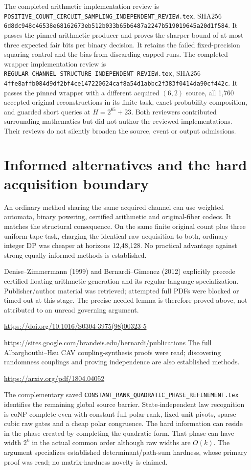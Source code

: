 \documentclass[11pt]{article}
\begin{document}
The completed arithmetic implementation review is
\nolinkurl{POSITIVE_COUNT_CIRCUIT_SAMPLING_INDEPENDENT_REVIEW.tex}, SHA256
\nolinkurl{6d8dc948c46538e68162673eb512b033b65b6487a2247b519019645a20d1f584}.
It passes the pinned arithmetic producer and proves the sharper bound of
at most three expected fair bits per binary decision. It retains the failed
fixed-precision squaring control and the bias from discarding capped runs.
The completed wrapper implementation review is
\nolinkurl{REGULAR_CHANNEL_STRUCTURE_INDEPENDENT_REVIEW.tex}, SHA256
\nolinkurl{4ffe8affb084d9df2bf4ce147220624caf8a54d1abbc2f383f0414da90cf442c}.
It passes the pinned wrapper with a different acquired $(6,2)$ source,
all 1,760 accepted original reconstructions in its finite task, exact
probability composition, and guarded short queries at $H=2^{65}+23$.
Both reviewers contributed surrounding mathematics but did not author the
reviewed implementations. Their reviews do not silently broaden the source,
event or output admissions.

\section{Informed alternatives and the hard acquisition boundary}
An ordinary method sharing the same acquired channel can use weighted
automata, binary powering, certified arithmetic and original-fiber codecs.
It matches the structural consequence. On the same finite original count
plus three uniform-tape task, charging the identical raw acquisition to both,
ordinary integer DP was cheaper at horizons 12,48,128. No practical advantage
against strong equally informed methods is established.

Denise--Zimmermann (1999) and Bernardi--Gimenez (2012) explicitly precede
certified floating-arithmetic generation and its regular-language specialization.
Publisher/author material was retrieved; attempted full PDFs were blocked or
timed out at this stage. The precise needed lemma is therefore proved above,
not attributed to an unread governing argument.
\par\url{https://doi.org/10.1016/S0304-3975(98)00323-5}
\par\url{https://sites.google.com/brandeis.edu/bernardi/publications}
The full Albarghouthi--Hsu CAV coupling-synthesis proofs were read; discovering
randomness couplings and proving independence are also established methods.
\par\url{https://arxiv.org/pdf/1804.04052}

The complementary saved
\nolinkurl{CONSTANT_RANK_QUADRATIC_PHASE_REFINEMENT.tex} identifies the remaining
global source barrier. State-independent law recognition is coNP-complete
even with constant full polar rank, fixed unit pivots, sparse cubic raw gates
and a cheap polar congruence. The hard information can reside in the phase
created by completing the quadratic form. That phase can have width $2^k$
in the actual common order although raw widths are $O(k)$.
The argument specializes established determinant/path-sum hardness, whose
primary proof was read; no matrix-hardness novelty is claimed.
\end{document}
